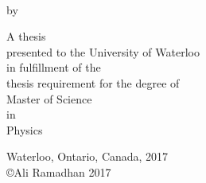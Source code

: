 \begin{titlepage}
  \begin{addmargin}[-1cm]{-3cm}
    \begin{center}
      \Large  
      
      \hfill
      
      \vfill
      
      \begingroup
      \color{Maroon}{\Large \spacedallcaps{\myTitle}} \\ \bigskip
      \endgroup
      
      by \\ \bigskip
      
      \spacedlowsmallcaps{\myName}
      
      \vfill
      
      A thesis \\
      presented to the University of Waterloo \\
      in fulfillment of the \\
      thesis requirement for the degree of \\
      Master of Science \\
      in \\
      Physics
      
      \vfill
      
      Waterloo, Ontario, Canada, 2017 \\
      \copyright Ali Ramadhan 2017
      
    \end{center}  
  \end{addmargin}       
\end{titlepage}  
